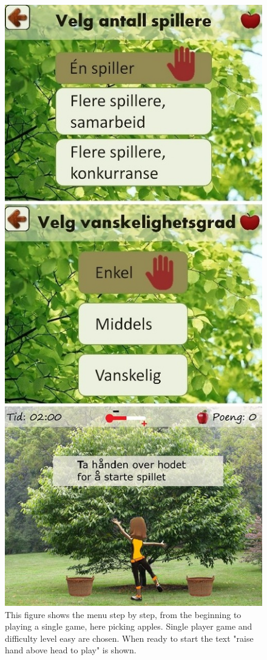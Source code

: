 \begin{figure} [H]
\centering
\includegraphics[scale=0.45]{menuStep2.jpg}
\caption[Menu review - part two]{This figure shows the menu step by step, from the beginning to playing a single game, here picking apples. Single player game and difficulty level easy are chosen. When ready to start the text "raise hand above head to play" is shown.}
\label{menu2}
\end{figure}

